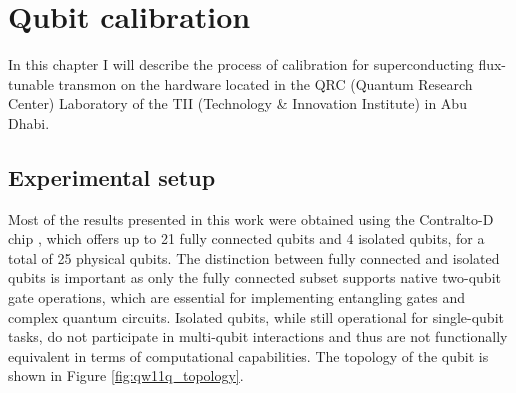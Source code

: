 \chapter{Qubit calibration}

In this chapter I will describe the process of calibration for superconducting flux-tunable transmon on the hardware located in the QRC (Quantum Research Center) Laboratory of the TII (Technology \& Innovation Institute) in Abu Dhabi.

\section{Experimental setup}
Most of the results presented in this work were obtained using the Contralto-D chip \cite{qw11q}, which offers up to 21 fully connected qubits and 4 isolated qubits, for a total of 25 physical qubits.
The distinction between fully connected and isolated qubits is important as only the fully connected subset supports native two-qubit gate operations, which are essential for implementing entangling gates and complex quantum circuits. 
Isolated qubits, while still operational for single-qubit tasks, do not participate in multi-qubit interactions and thus are not functionally equivalent in terms of computational capabilities.
The topology of the qubit is shown in Figure \ref{fig:qw11q_topology}.

